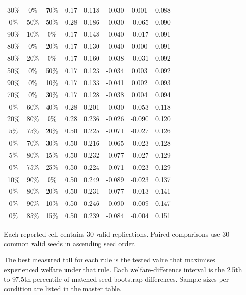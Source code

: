 \documentclass{article}
\begin{document}
\begin{landscape}
\begin{longtable}{cccccccc}
30\% & 0\% & 70\% & 0.17 & 0.118 & -0.030 & 0.001 & 0.088 \\
0\% & 50\% & 50\% & 0.28 & 0.186 & -0.030 & -0.065 & 0.090 \\
90\% & 10\% & 0\% & 0.17 & 0.148 & -0.040 & -0.017 & 0.091 \\
80\% & 0\% & 20\% & 0.17 & 0.130 & -0.040 & 0.000 & 0.091 \\
80\% & 20\% & 0\% & 0.17 & 0.160 & -0.038 & -0.031 & 0.092 \\
50\% & 0\% & 50\% & 0.17 & 0.123 & -0.034 & 0.003 & 0.092 \\
90\% & 0\% & 10\% & 0.17 & 0.133 & -0.041 & 0.002 & 0.093 \\
70\% & 0\% & 30\% & 0.17 & 0.128 & -0.038 & 0.004 & 0.094 \\
0\% & 60\% & 40\% & 0.28 & 0.201 & -0.030 & -0.053 & 0.118 \\
20\% & 80\% & 0\% & 0.28 & 0.236 & -0.026 & -0.090 & 0.120 \\
5\% & 75\% & 20\% & 0.50 & 0.225 & -0.071 & -0.027 & 0.126 \\
0\% & 70\% & 30\% & 0.50 & 0.216 & -0.065 & -0.023 & 0.128 \\
5\% & 80\% & 15\% & 0.50 & 0.232 & -0.077 & -0.027 & 0.129 \\
0\% & 75\% & 25\% & 0.50 & 0.224 & -0.071 & -0.023 & 0.129 \\
10\% & 90\% & 0\% & 0.50 & 0.249 & -0.089 & -0.023 & 0.137 \\
0\% & 80\% & 20\% & 0.50 & 0.231 & -0.077 & -0.013 & 0.141 \\
0\% & 90\% & 10\% & 0.50 & 0.246 & -0.090 & -0.009 & 0.147 \\
0\% & 85\% & 15\% & 0.50 & 0.239 & -0.084 & -0.004 & 0.151 \\
\end{longtable}
\end{landscape}
\ClearShipoutPictureFG
\pagestyle{plain}

Each reported cell contains 30 valid replications. Paired comparisons use 30 common valid seeds in ascending seed order.

The best measured toll for each rule is the tested value that maximises experienced welfare under that rule. Each welfare-difference interval is the 2.5th to 97.5th percentile of matched-seed bootstrap differences. Sample sizes per condition are listed in the master table.

\clearpage
\printbibliography[title={References}]
\end{document}
